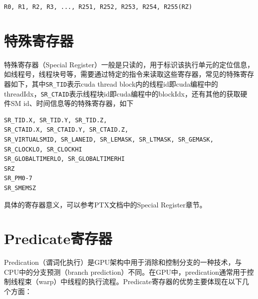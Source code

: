 \begin{lstlisting}
R0, R1, R2, R3, ..., R251, R252, R253, R254, R255(RZ)
\end{lstlisting}

\section{特殊寄存器}

特殊寄存器（Special Register）一般是只读的，用于标识该执行单元的定位信息，如线程号，线程块号等，需要通过特定的指令来读取这些寄存器，常见的特殊寄存器如下，其中\lstinline|SR_TID|表示cuda thread block内的线程id即cuda编程中的threadIdx，\lstinline|SR_CTAID|表示线程块id即cuda编程中的blockIdx，还有其他的获取硬件SM id、时间信息等的特殊寄存器，如下

\begin{lstlisting}
SR_TID.X, SR_TID.Y, SR_TID.Z,
SR_CTAID.X, SR_CTAID.Y, SR_CTAID.Z,
SR_VIRTUALSMID, SR_LANEID, SR_LEMASK, SR_LTMASK, SR_GEMASK,
SR_CLOCKLO, SR_CLOCKHI
SR_GLOBALTIMERLO, SR_GLOBALTIMERHI
SRZ
SR_PM0-7
SR_SMEMSZ
\end{lstlisting}

具体的寄存器意义，可以参考PTX文档中的Special Register章节。

\section{Predicate寄存器}

Predication（谓词化执行）是GPU架构中用于消除和控制分支的一种技术，与CPU中的分支预测（branch prediction）不同。在GPU中，predication通常用于控制线程束（warp）中线程的执行流程。Predicate寄存器的优势主要体现在以下几个方面：

